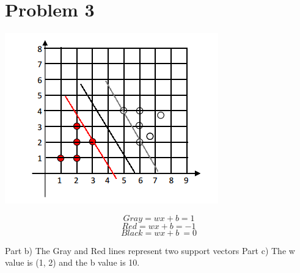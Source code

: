 \documentclass{article}
\begin{document}
\section{Problem 3}

\includegraphics[scale = .6]{Kmeans1.png}

\[Gray = wx + b = 1\] 
\[Red = wx + b = -1\] 
\[Black = wx + b\ = 0\]

\noindent Part b) The Gray and Red lines represent two support vectors 
\newline\newline
Part c) The w value is (1, 2) and the b value is 10.
\newpage
\end{document}
